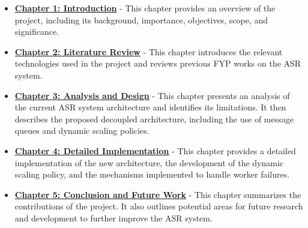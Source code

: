 \begin{itemize}
    \item \hyperref[chapter:introduction]{\textbf{Chapter 1: Introduction}} - This chapter provides an overview of the project, including its background, importance, objectives, scope, and significance.
    
    \item \hyperref[chapter:literature_review]{\textbf{Chapter 2: Literature Review}} - This chapter introduces the relevant technologies used in the project and reviews previous FYP works on the ASR system.
    
    \item \hyperref[chapter:analysis_and_design]{\textbf{Chapter 3: Analysis and Design}} - This chapter presents an analysis of the current ASR system architecture and identifies its limitations. It then describes the proposed decoupled architecture, including the use of message queues and dynamic scaling policies.
    
    \item \hyperref[chapter:detailed_implementation]{\textbf{Chapter 4: Detailed Implementation}} - This chapter provides a detailed implementation of the new architecture, the development of the dynamic scaling policy, and the mechanisms implemented to handle worker failures.
    
    \item \hyperref[chapter:conclusion_and_future_work]{\textbf{Chapter 5: Conclusion and Future Work}} - This chapter summarizes the contributions of the project. It also outlines potential areas for future research and development to further improve the ASR system.
\end{itemize}

